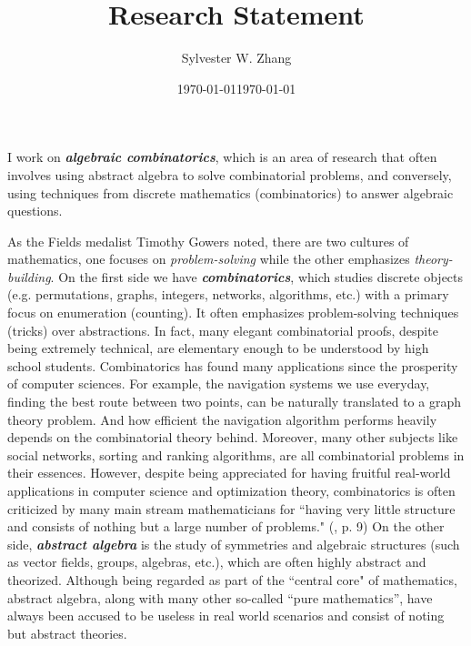 \documentclass[11pt]{amsart}
\title{Research Statement}
\date{\today}
\author{Sylvester W. Zhang}
\date{\today}
\newcommand{\Emph}[1]{\textbf{\emph{#1}}}
\begin{document}
\maketitle
I work on \Emph{algebraic combinatorics}, which is an area of research that often involves using abstract algebra to solve combinatorial problems, and conversely, using techniques from discrete mathematics (combinatorics) to answer algebraic questions. 

As the Fields medalist Timothy Gowers \cite{gowers2000two} noted, there are two cultures of mathematics, one focuses on \emph{problem-solving} while the other emphasizes \emph{theory-building}.
On the first side we have \Emph{combinatorics}, which studies discrete objects (e.g. permutations, graphs, integers, networks, algorithms, etc.) with a primary focus on enumeration (counting). It often emphasizes problem-solving techniques (tricks) over abstractions. In fact, many elegant combinatorial proofs, despite being extremely technical, are elementary enough to be understood by high school students. %
Combinatorics has found many applications since the prosperity of computer sciences. For example, the navigation systems we use everyday, finding the best route between two points, can be naturally translated to a graph theory problem. And how efficient the navigation algorithm performs heavily depends on the combinatorial theory behind. Moreover, many other subjects like social networks, sorting and ranking algorithms, are all combinatorial problems in their essences.
However, despite being appreciated for having fruitful real-world applications in computer science and optimization theory, combinatorics is often criticized by many main stream mathematicians for ``having very little structure and consists of nothing but a large
number of problems." (\cite{gowers2000two}, p. 9)
On the other side, \Emph{abstract algebra} is the study of symmetries and algebraic structures (such as vector fields, groups, algebras, etc.), which are often highly abstract and theorized. Although being regarded as part of the ``central core" of mathematics, abstract algebra, along with many other so-called ``pure mathematics'', have always been accused to be useless in real world scenarios and consist of noting but abstract theories.
\end{document}
